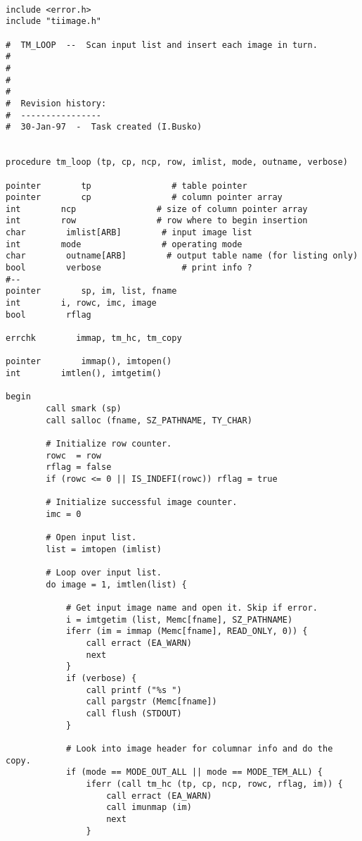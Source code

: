 \begin{verbatim}

include <error.h>
include "tiimage.h"

#  TM_LOOP  --  Scan input list and insert each image in turn.
#
#
#
#
#  Revision history:
#  ----------------
#  30-Jan-97  -  Task created (I.Busko)


procedure tm_loop (tp, cp, ncp, row, imlist, mode, outname, verbose)

pointer        tp                # table pointer
pointer        cp                # column pointer array
int        ncp                # size of column pointer array
int        row                # row where to begin insertion
char        imlist[ARB]        # input image list
int        mode                # operating mode
char        outname[ARB]        # output table name (for listing only)
bool        verbose                # print info ?
#--
pointer        sp, im, list, fname
int        i, rowc, imc, image
bool        rflag

errchk        immap, tm_hc, tm_copy

pointer        immap(), imtopen()
int        imtlen(), imtgetim()

begin
        call smark (sp)
        call salloc (fname, SZ_PATHNAME, TY_CHAR)

        # Initialize row counter.
        rowc  = row
        rflag = false
        if (rowc <= 0 || IS_INDEFI(rowc)) rflag = true

        # Initialize successful image counter.
        imc = 0

        # Open input list.
        list = imtopen (imlist)        

        # Loop over input list.
        do image = 1, imtlen(list) {

            # Get input image name and open it. Skip if error.
            i = imtgetim (list, Memc[fname], SZ_PATHNAME)
            iferr (im = immap (Memc[fname], READ_ONLY, 0)) {
                call erract (EA_WARN)
                next
            }
            if (verbose) {
                call printf ("%s ")
                call pargstr (Memc[fname])
                call flush (STDOUT)
            }

            # Look into image header for columnar info and do the copy.
            if (mode == MODE_OUT_ALL || mode == MODE_TEM_ALL) {
                iferr (call tm_hc (tp, cp, ncp, rowc, rflag, im)) {
                    call erract (EA_WARN)
                    call imunmap (im)
                    next
                }


\end{verbatim}
